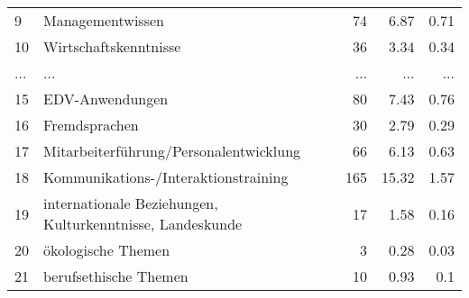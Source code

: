 \begin{longtable}{lXrrr}
        9 & \multicolumn{1}{X}{Managementwissen} & %
          \num{74} &
          \num[round-mode=places,round-precision=2]{6,87} &
          \num[round-mode=places,round-precision=2]{0,71} \\
        10 & \multicolumn{1}{X}{Wirtschaftskenntnisse} & %
          \num{36} &
          \num[round-mode=places,round-precision=2]{3,34} &
          \num[round-mode=places,round-precision=2]{0,34} \\
       ... & ... & ... & ... & ... \\
        15 & \multicolumn{1}{X}{EDV-Anwendungen} & %
          \num{80} &
          \num[round-mode=places,round-precision=2]{7,43} &
          \num[round-mode=places,round-precision=2]{0,76} \\

        16 & \multicolumn{1}{X}{Fremdsprachen} & %
          \num{30} &
          \num[round-mode=places,round-precision=2]{2,79} &
          \num[round-mode=places,round-precision=2]{0,29} \\

        17 & \multicolumn{1}{X}{Mitarbeiterführung/Personalentwicklung} & %
          \num{66} &
          \num[round-mode=places,round-precision=2]{6,13} &
          \num[round-mode=places,round-precision=2]{0,63} \\

        18 & \multicolumn{1}{X}{Kommunikations-/Interaktionstraining} & %
          \num{165} &
          \num[round-mode=places,round-precision=2]{15,32} &
          \num[round-mode=places,round-precision=2]{1,57} \\

        19 & \multicolumn{1}{X}{internationale Beziehungen, Kulturkenntnisse, Landeskunde} & %
          \num{17} &
          \num[round-mode=places,round-precision=2]{1,58} &
          \num[round-mode=places,round-precision=2]{0,16} \\

        20 & \multicolumn{1}{X}{ökologische Themen} & %
          \num{3} &
          \num[round-mode=places,round-precision=2]{0,28} &
          \num[round-mode=places,round-precision=2]{0,03} \\

        21 & \multicolumn{1}{X}{berufsethische Themen} & %
          \num{10} &
          \num[round-mode=places,round-precision=2]{0,93} &
          \num[round-mode=places,round-precision=2]{0,1} \\


\end{longtable}
